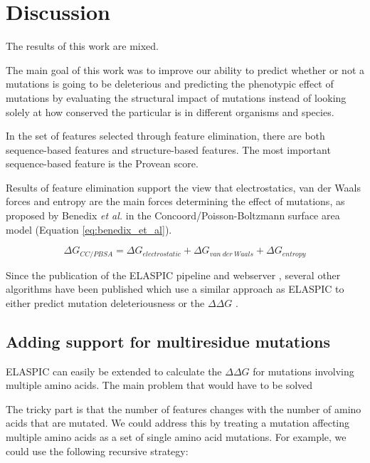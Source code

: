 
\chapter{Discussion} \label{ch:discussion}

The results of this work are mixed.

The main goal of this work was to improve our ability to predict whether or not a mutations is going to be deleterious and predicting the phenotypic effect of mutations by evaluating the structural impact of mutations instead of looking solely at how conserved the particular is in different organisms and species.

In the set of features selected through feature elimination, there are both sequence-based features and structure-based features. The most important sequence-based feature is the Provean score.

Results of feature elimination support the view that electrostatics, van der Waals forces and entropy are the main forces determining the effect of mutations, as proposed by Benedix \textit{et al.} in the Concoord/Poisson-Boltzmann surface area model (Equation \ref{eq:benedix_et_al}).

\begin{equation} \label{eq:benedix_et_al}
    \Delta G_{CC/PBSA} = \Delta G_{electrostatic} + \Delta G_{van\ der\ Waals} + \Delta G_{entropy}
\end{equation}

Since the publication of the ELASPIC pipeline \cite{berliner_combining_2014} and webserver \cite{witvliet_elaspic_2016}, several other algorithms have been published which use a similar approach as ELASPIC to either predict mutation deleteriousness \cite{baugh_robust_2016} or the $\Delta \Delta G$ \cite{li_mutabind_2016}.



\section{Adding support for multiresidue mutations}

ELASPIC can easily be extended to calculate the $\Delta \Delta G$ for mutations involving multiple amino acids. The main problem that would have to be solved

The tricky part is that the number of features changes with the number of amino acids that are mutated. We could address this by treating a mutation affecting multiple amino acids as a set of single amino acid mutations. For example, we could use the following recursive strategy:

